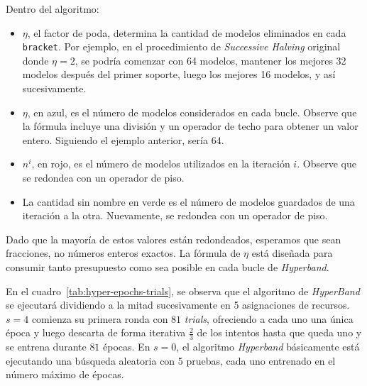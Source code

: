 \documentclass[a4paper,12pt]{article}
\begin{document}
Dentro del algoritmo:
\begin{itemize}[noitemsep, topsep=2pt]
	\item $\eta$, el factor de poda, determina la cantidad de modelos eliminados en cada \texttt{bracket}. Por ejemplo, en el procedimiento de \textit{Successive Halving} original donde $\eta = 2$, se podría comenzar con 64 modelos, mantener los mejores 32 modelos después del primer soporte, luego los mejores 16 modelos, y así sucesivamente.
	\item $\eta$, en azul, es el número de modelos considerados en cada bucle. Observe que la fórmula incluye una división y un operador de techo para obtener un valor entero. Siguiendo el ejemplo anterior, sería 64.
	\item $n^i$, en rojo, es el número de modelos utilizados en la iteración $i$. Observe que se redondea con un operador de piso.
	\item La cantidad sin nombre en verde es el número de modelos guardados de una iteración a la otra. Nuevamente, se redondea con un operador de piso.
\end{itemize}

Dado que la mayoría de estos valores están redondeados, esperamos que sean fracciones, no números enteros exactos. La fórmula de $\eta$ está diseñada para consumir tanto presupuesto como sea posible en cada bucle de \textit{Hyperband}.

En el cuadro~\ref{tab:hyper-epochs-trials}, se observa que el algoritmo de \textit{HyperBand} se ejecutará dividiendo a la mitad sucesivamente en 5 asignaciones de recursos. $s=4$ comienza su primera ronda con $81$ \textit{trials}, ofreciendo a cada uno una única época y luego descarta de forma iterativa $\frac{2}{3}$ de los intentos hasta que queda uno y se entrena durante $81$ épocas. En $s=0$, el algoritmo \textit{Hyperband} básicamente está ejecutando una búsqueda aleatoria con  5 pruebas, cada uno entrenado en el número máximo de épocas.
\end{document}
